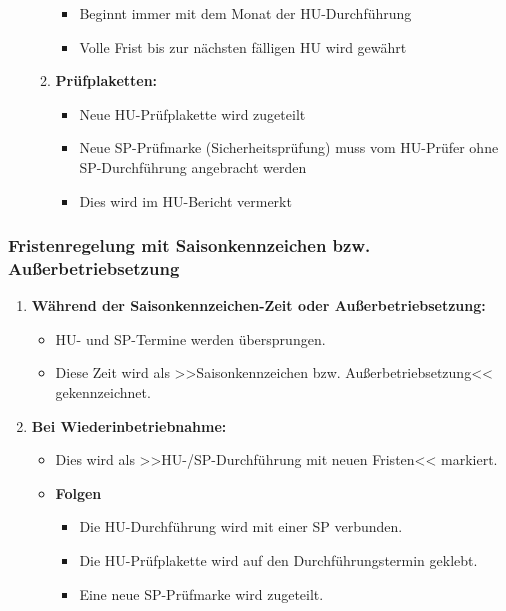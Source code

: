 \documentclass{vorlage-design-main}
\begin{document}
\begin{enumerate}
\begin{enumerate}
    \begin{itemize}

    \item
      Beginnt immer mit dem Monat der HU-Durchführung
    \item
      Volle Frist bis zur nächsten fälligen HU wird gewährt
    \end{itemize}
  \item
    \textbf{Prüfplaketten:}

    \begin{itemize}

    \item
      Neue HU-Prüfplakette wird zugeteilt
    \item
      Neue SP-Prüfmarke (Sicherheitsprüfung) muss vom HU-Prüfer ohne
      SP-Durchführung angebracht werden
    \item
      Dies wird im HU-Bericht vermerkt
    \end{itemize}
  \end{enumerate}
\end{enumerate}

\subsubsection{Fristenregelung mit Saisonkennzeichen bzw.
Außerbetriebsetzung}\label{fristenregelung-mit-saisonkennzeichen-bzw.-ausserbetriebsetzung}

\begin{enumerate}
\def\labelenumi{\arabic{enumi}.}

\item
  \textbf{Während der Saisonkennzeichen-Zeit oder Außerbetriebsetzung:}

  \begin{itemize}

  \item
    HU- und SP-Termine werden übersprungen.
  \item
    Diese Zeit wird als >>Saisonkennzeichen bzw. Außerbetriebsetzung<<
    gekennzeichnet.
  \end{itemize}
\item
  \textbf{Bei Wiederinbetriebnahme:}

  \begin{itemize}

  \item
    Dies wird als >>HU-/SP-Durchführung mit neuen Fristen<< markiert.
  \item
    \textbf{Folgen}

    \begin{itemize}

    \item
      Die HU-Durchführung wird mit einer SP verbunden.
    \item
      Die HU-Prüfplakette wird auf den Durchführungstermin geklebt.
    \item
      Eine neue SP-Prüfmarke wird zugeteilt.
    \end{itemize}
  \end{itemize}
\end{enumerate}
\end{document}
